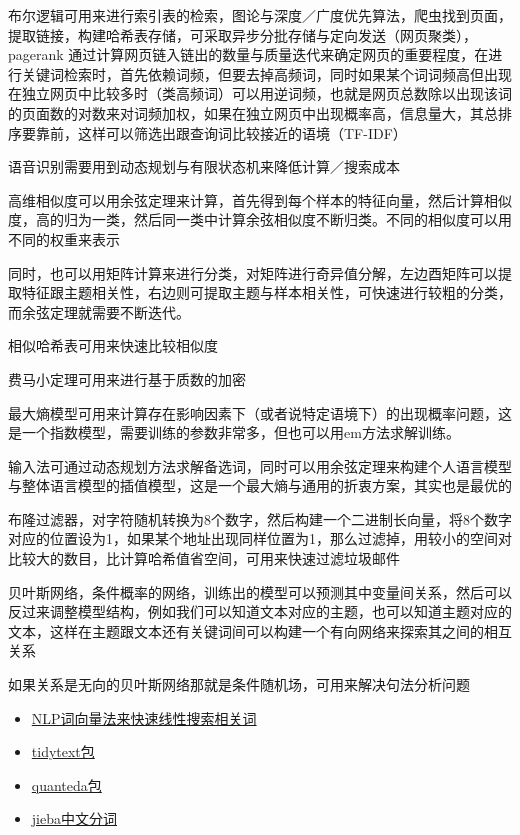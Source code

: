 \documentclass[]{book}
\providecommand{\tightlist}{%
  \setlength{\itemsep}{0pt}\setlength{\parskip}{0pt}}
\begin{document}
布尔逻辑可用来进行索引表的检索，图论与深度／广度优先算法，爬虫找到页面，提取链接，构建哈希表存储，可采取异步分批存储与定向发送（网页聚类），pagerank 通过计算网页链入链出的数量与质量迭代来确定网页的重要程度，在进行关键词检索时，首先依赖词频，但要去掉高频词，同时如果某个词词频高但出现在独立网页中比较多时（类高频词）可以用逆词频，也就是网页总数除以出现该词的页面数的对数来对词频加权，如果在独立网页中出现概率高，信息量大，其总排序要靠前，这样可以筛选出跟查询词比较接近的语境（TF-IDF）

语音识别需要用到动态规划与有限状态机来降低计算／搜索成本

高维相似度可以用余弦定理来计算，首先得到每个样本的特征向量，然后计算相似度，高的归为一类，然后同一类中计算余弦相似度不断归类。不同的相似度可以用不同的权重来表示

同时，也可以用矩阵计算来进行分类，对矩阵进行奇异值分解，左边酉矩阵可以提取特征跟主题相关性，右边则可提取主题与样本相关性，可快速进行较粗的分类，而余弦定理就需要不断迭代。

相似哈希表可用来快速比较相似度

费马小定理可用来进行基于质数的加密

最大熵模型可用来计算存在影响因素下（或者说特定语境下）的出现概率问题，这是一个指数模型，需要训练的参数非常多，但也可以用em方法求解训练。

输入法可通过动态规划方法求解备选词，同时可以用余弦定理来构建个人语言模型与整体语言模型的插值模型，这是一个最大熵与通用的折衷方案，其实也是最优的

布隆过滤器，对字符随机转换为8个数字，然后构建一个二进制长向量，将8个数字对应的位置设为1，如果某个地址出现同样位置为1，那么过滤掉，用较小的空间对比较大的数目，比计算哈希值省空间，可用来快速过滤垃圾邮件

贝叶斯网络，条件概率的网络，训练出的模型可以预测其中变量间关系，然后可以反过来调整模型结构，例如我们可以知道文本对应的主题，也可以知道主题对应的文本，这样在主题跟文本还有关键词间可以构建一个有向网络来探索其之间的相互关系

如果关系是无向的贝叶斯网络那就是条件随机场，可用来解决句法分析问题

\begin{itemize}
\tightlist
\item
  \href{https://juliasilge.com/blog/tidy-word-vectors/}{NLP词向量法来快速线性搜索相关词}
\item
  \href{https://cran.r-project.org/web/packages/tidytext/vignettes/tidytext.html}{tidytext包}
\item
  \href{http://docs.quanteda.io/index.html}{quanteda包}
\item
  \href{https://github.com/qinwf/jiebaR}{jieba中文分词}
\end{itemize}
\end{document}
